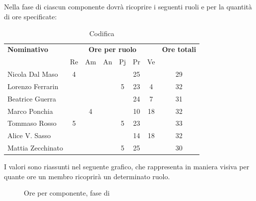 \subsection{\Cod}
Nella fase di \Cod ciascun componente dovrà ricoprire i seguenti ruoli e per la quantità di ore specificate:

\begin{table}[H]
	\centering
	\begin{tabular}{|l|c|c|c|c|c|c|c|}
		\hline
		\textbf{Nominativo} & 
		\multicolumn{6}{c|}{\textbf{Ore per ruolo}} & 
		\textbf{Ore totali} \\
		& Re & Am & An & Pj & Pr & Ve & \\
		\hline
		Nicola Dal Maso &4 & & & &25 & & 29 \\
		Lorenzo Ferrarin & & & &5 &23 &4 & 32 \\
		Beatrice Guerra & & & & &24 &7 & 31 \\
		Marco Ponchia & &4 & & &10 &18 & 32 \\
		Tommaso Rosso &5 & & &5 &23 & & 33 \\
		Alice V. Sasso & & & & &14 &18 & 32 \\
		Mattia Zecchinato & & & &5 &25 & & 30 \\
		\hline
	\end{tabular}
	\caption{Codifica}
\end{table}
I valori sono riassunti nel seguente grafico, che rappresenta in maniera visiva per quante ore un membro ricoprirà un determinato ruolo.
\begin{figure}[H]
	\centering
	\caption{Ore per componente, fase di \Cod}
\end{figure}

